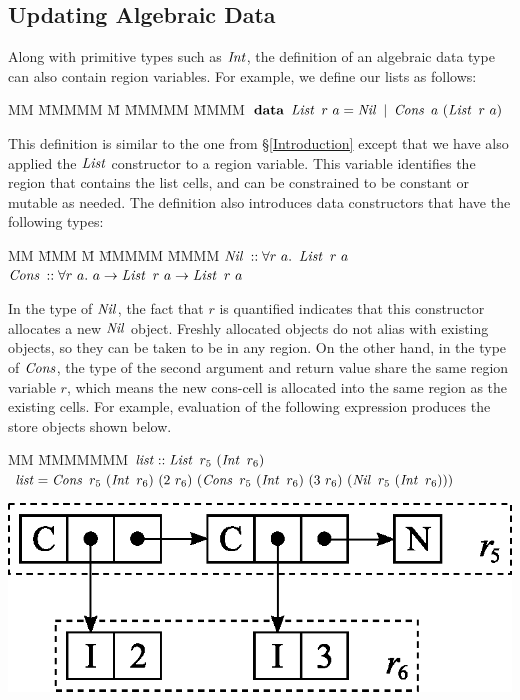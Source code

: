 \subsection{Updating Algebraic Data}
Along with primitive types such as $\operatorname{\mathit{Int}}$, the definition of an algebraic data type can also contain region variables. For example, we define our lists as follows:
\begin{tabbing}
MM \= MMMMM \= M \= MMMMM \= MMMM \kill
	\> $\textrm{\textbf{data}} \ \operatorname{\mathit{List}} \ r \ a = \operatorname{\mathit{Nil}} \ | \ \operatorname{\mathit{Cons}} \ a \ (\operatorname{\mathit{List}} \ r \ a)$
\end{tabbing}
This definition is similar to the one from \S\ref{Introduction} except that we have also applied the $\operatorname{\mathit{List}}$ constructor to a region variable. This variable identifies the region that contains the list cells, and can be constrained to be constant or mutable as needed. The definition also introduces data constructors that have the following types:
\begin{tabbing}
MM \= MMM \= M \= MMMMM \= MMMM \kill
	\> $\operatorname{\mathit{Nil}}$	\> $:: \forall r \ a. \ \operatorname{\mathit{List}} \ r \ a$ \\
	\> $\operatorname{\mathit{Cons}}$	\> $:: \forall r \ a. \ a \to \operatorname{\mathit{List}} \ r \ a \to \operatorname{\mathit{List}} \ r \ a$  
\end{tabbing}
In the type of $\operatorname{\mathit{Nil}}$, the fact that $r$ is quantified indicates that this constructor allocates a new $\operatorname{\mathit{Nil}}$ object. Freshly allocated objects do not alias with existing objects, so they can be taken to be in any region. On the other hand, in the type of $\operatorname{\mathit{Cons}}$, the type of the second argument and return value share the same region variable $r$, which means the new cons-cell is allocated into the same region as the existing cells. For example, evaluation of the following expression produces the store objects shown below.

\begin{tabbing}
MM	\= MMMMMMM \kill
	\> $\operatorname{\mathit{list}} :: \operatorname{\mathit{List}} \ r_5 \ (\operatorname{\mathit{Int}} \ r_6)$ \\
	\> $\ilist = \iCons \ r_5 \ (\iInt \ r_6) \ (2 \ r_6) \ 
			(\iCons \ r_5 \ (\iInt \ r_6) \ (3 \ r_6) \ (\iNil \ r_5 \ (\iInt \ r_6)))$
\end{tabbing}

\begin{center}
\includegraphics[scale=0.6]{fig/list-regions.eps}
\end{center}

